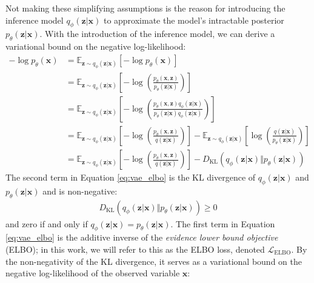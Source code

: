 \documentclass[ oneside,%
                    author={George Herbert},
                    degree={MSci},
                     title={Video Diffusion Models for Climate Simulations},
                  subtitle={}]{dissertation}
\begin{document}
Not making these simplifying assumptions is the reason for introducing the inference model $q_\phi(\mathbf{z}|\mathbf{x})$ to approximate the model's intractable posterior $p_\theta(\mathbf{z}|\mathbf{x})$. With the introduction of the inference model, we can derive a variational bound on the negative log-likelihood:
\begin{align}
      -\log p_\theta(\mathbf{x})&=\mathbb{E}_{\mathbf{z}\sim q_\phi(\mathbf{z}|\mathbf{x})}\left[-\log p_\theta(\mathbf{x})\right]\\
      &=\mathbb{E}_{\mathbf{z}\sim q_\phi(\mathbf{z}|\mathbf{x})}\left[-\log\left(\frac{p_\theta(\mathbf{x},\mathbf{z})}{p_\theta(\mathbf{z}|\mathbf{x})}\right)\right]\\
      &=\mathbb{E}_{\mathbf{z}\sim q_\phi(\mathbf{z}|\mathbf{x})}\left[-\log\left(\frac{p_\theta(\mathbf{x},\mathbf{z})q_\phi(\mathbf{z}|\mathbf{x})}{p_\theta(\mathbf{z}|\mathbf{x})q_\phi(\mathbf{z}|\mathbf{x})}\right)\right]\\
      &=\mathbb{E}_{\mathbf{z}\sim q_\phi(\mathbf{z}|\mathbf{x})}\left[-\log\left(\frac{p_\theta(\mathbf{x},\mathbf{z})}{q(\mathbf{z}|\mathbf{x})}\right)\right]-\mathbb{E}_{\mathbf{z}\sim q_\phi(\mathbf{z}|\mathbf{x})}\left[\log\left(\frac{q(\mathbf{z}|\mathbf{x})}{p_\theta(\mathbf{z}|\mathbf{x})}\right)\right]\\
      &=\mathbb{E}_{\mathbf{z}\sim q_\phi(\mathbf{z}|\mathbf{x})}\left[-\log\left(\frac{p_\theta(\mathbf{x},\mathbf{z})}{q(\mathbf{z}|\mathbf{x})}\right)\right]-D_{\mathrm{KL}}(q_\phi(\mathbf{z}|\mathbf{x})\Vert p_\theta(\mathbf{z}|\mathbf{x}))
      \label{eq:vae_elbo}
\end{align}
The second term in Equation \ref{eq:vae_elbo} is the KL divergence of $q_\phi(\mathbf{z}|\mathbf{x})$ and $p_\theta(\mathbf{z}|\mathbf{x})$ and is non-negative:
\begin{align}
      D_{\mathrm{KL}}(q_\phi(\mathbf{z}|\mathbf{x})\Vert p_\theta(\mathbf{z}|\mathbf{x}))\ge 0
\end{align}
and zero if and only if $q_\phi(\mathbf{z}|\mathbf{x})=p_\theta(\mathbf{z}|\mathbf{x})$. The first term in Equation \ref{eq:vae_elbo} is the additive inverse of the \textit{evidence lower bound objective} (ELBO); in this work, we will refer to this as the ELBO loss, denoted $\mathcal{L}_{\mathrm{ELBO}}$. By the non-negativity of the KL divergence, it serves as a variational bound on the negative log-likelihood of the observed variable $\mathbf{x}$:
\end{document}
